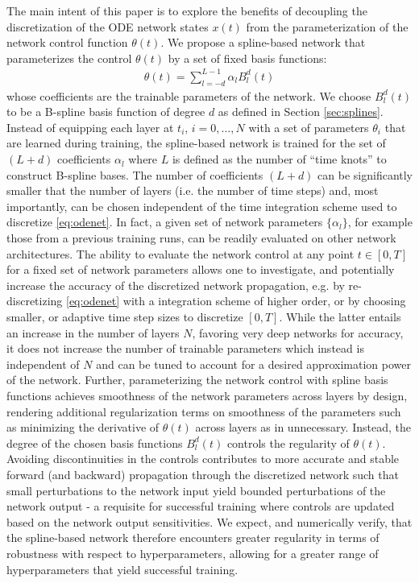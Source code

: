 \documentclass[12pt]{amsart}
\begin{document}
The main intent of this paper is to explore the benefits of decoupling the discretization of the ODE network states $x(t)$ from the parameterization of the network control function $\theta(t)$.
We propose a spline-based network that parameterizes the control $\theta(t)$ by a set of fixed basis functions:
\begin{align}
  \theta(t) = \sum_{l=-d}^{L-1} \alpha_l B^d_l(t)
\end{align}
whose coefficients are the trainable parameters of the network.
We choose $B_l^d(t)$ to be a B-spline basis function of degree $d$ as defined in Section \ref{sec:splines}.
Instead of equipping each layer at $t_i$, $i=0,\dots,N$ with a set of parameters $\theta_i$ that are learned during training, the spline-based network is trained for the set of $(L+d)$ coefficients $\alpha_l$ where $L$ is defined as the number of ``time knots'' to construct B-spline bases.
The number of coefficients $(L+d)$ can be significantly smaller that the number of layers (i.e. the number of time steps) and, most importantly, can be chosen independent of the time integration scheme used to discretize \eqref{eq:odenet}.
In fact, a given set of network parameters $\{\alpha_l\}$, for example those from a previous training runs, can be readily evaluated on other network architectures.
The ability to evaluate the network control at any point $t\in[0,T]$ for a fixed set of network parameters allows one to investigate, and potentially increase the accuracy of the discretized network propagation, e.g. by re-discretizing \eqref{eq:odenet} with a integration scheme of higher order, or by choosing smaller, or adaptive time step sizes to discretize $[0,T]$.
While the latter entails an increase in the number of layers $N$, favoring very deep networks for accuracy, it does not increase the number of trainable parameters which instead is independent of $N$ and can be tuned to account for a desired approximation power of the network.
Further, parameterizing the network control with spline basis functions achieves smoothness of the network parameters across layers by design,  rendering additional regularization terms on smoothness of the parameters such as minimizing the derivative of $\theta(t)$ across layers as in \cite{haber2017stable} unnecessary.
Instead, the degree of the chosen basis functions $B^d_l(t)$ controls the regularity of $\theta(t)$.
Avoiding discontinuities in the controls contributes to more accurate and stable forward (and backward) propagation through the discretized network such that small perturbations to the network input yield bounded perturbations of the network output - a requisite for successful training where controls are updated based on the network output sensitivities.
We expect, and numerically verify, that the spline-based network therefore encounters greater regularity in terms of robustness with respect to hyperparameters, allowing for a greater range of hyperparameters that yield successful training.
\end{document}
